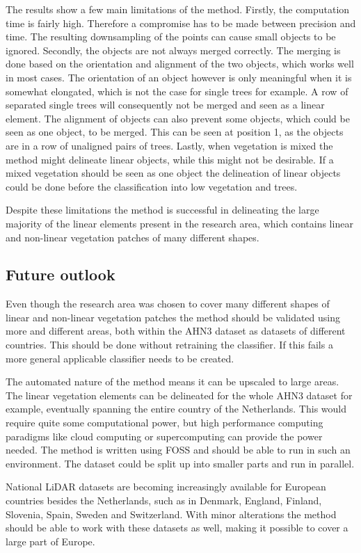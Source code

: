 The results show a few main limitations of the method. Firstly, the computation time is fairly high. Therefore a compromise has to be made between precision and time. The resulting downsampling of the points can cause small objects to be ignored. Secondly, the objects are not always merged correctly. The merging is done based on the orientation and alignment of the two objects, which works well in most cases. The orientation of an object however is only meaningful when it is somewhat elongated, which is not the case for single trees for example. A row of separated single trees will consequently not be merged and seen as a linear element. The alignment of objects can also prevent some objects, which could be seen as one object, to be merged. This can be seen at position 1, as the objects are in a row of unaligned pairs of trees. Lastly, when vegetation is mixed the method might delineate linear objects, while this might not be desirable. If a mixed vegetation should be seen as one object the delineation of linear objects could be done before the classification into low vegetation and trees.

Despite these limitations the method is successful in delineating the large majority of the linear elements present in the research area, which contains linear and non-linear vegetation patches of many different shapes.

\subsection{Future outlook}
Even though the research area was chosen to cover many different shapes of linear and non-linear vegetation patches the method should be validated using more and different areas, both within the AHN3 dataset as datasets of different countries. This should be done without retraining the classifier. If this fails a more general applicable classifier needs to be created.

The automated nature of the method means it can be upscaled to large areas. The linear vegetation elements can be delineated for the whole AHN3 dataset for example, eventually spanning the entire country of the Netherlands. This would require quite some computational power, but high performance computing paradigms like cloud computing or supercomputing can provide the power needed. The method is written using FOSS and should be able to run in such an environment. The dataset could be split up into smaller parts and run in parallel.

National LiDAR datasets are becoming increasingly available for European countries besides the Netherlands, such as in Denmark, England, Finland, Slovenia, Spain, Sweden and Switzerland. With minor alterations the method should be able to work with these datasets as well, making it possible to cover a large part of Europe.

